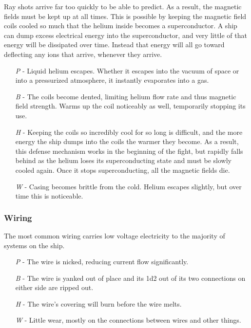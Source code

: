 \documentclass[a4paper]{article}
\begin{document}
Ray shots arrive far too quickly to be able to predict. As a result, the magnetic fields must be kept up at all times. This is possible by keeping the magnetic field coils cooled so much that the helium inside becomes a superconductor. A ship can dump excess electrical energy into the superconductor, and very little of that energy will be dissipated over time. Instead that energy will all go toward deflecting any ions that arrive, whenever they arrive.
\begin{enumerate}
\item [\textit{P}] - Liquid helium escapes. Whether it escapes into the vacuum of space or into a pressurized atmosphere, it instantly evaporates into a gas. 
\item [\textit{B}] - The coils become dented, limiting helium flow rate and thus magnetic field strength. Warms up the coil noticeably as well, temporarily stopping its use.
\item [\textit{H}] - Keeping the coils so incredibly cool for so long is difficult, and the more energy the ship dumps into the coils the warmer they become. As a result, this defense mechanism works in the beginning of the fight, but rapidly falls behind as the helium loses its superconducting state and must be slowly cooled again. Once it stops superconducting, all the magnetic fields die.
\item [\textit{W}] - Casing becomes brittle from the cold. Helium escapes slightly, but over time this is noticeable.
\end{enumerate}

\vspace{-0.5cm} \hspace{-18pt} \subsubsection{Wiring} \label{grid_wiring} \vspace{-0.2cm}
The most common wiring carries low voltage electricity to the majority of systems on the ship.
\begin{enumerate}
\item [\textit{P}] - The wire is nicked, reducing current flow significantly.
\item [\textit{B}] - The wire is yanked out of place and its 1d2 out of its two connections on either side are ripped out.
\item [\textit{H}] - The wire's covering will burn before the wire melts.
\item [\textit{W}] - Little wear, mostly on the connections between wires and other things.
\end{enumerate}
\end{document}
